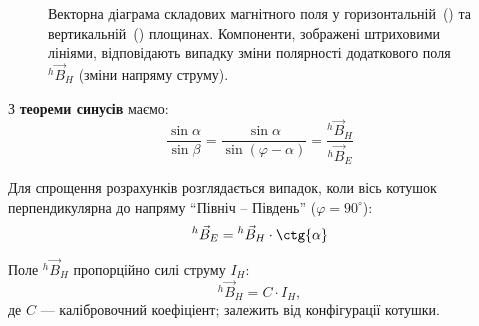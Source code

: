 \begin{figure}[ht!]
{
      }
    \caption{Векторна діаграма складових магнітного поля у   горизонтальній~() та  вертикальній~() площинах. Компоненти, зображені штриховими лініями, відповідають випадку зміни полярності додаткового поля $ {}^{h}\vec{B}_{H} $ (зміни напряму струму).}
    \label{vectordiagram}
\end{figure}

З \textbf{теореми синусів} маємо:
\begin{equation} \label{SinTheorem}
    \frac{\sin{\alpha}}{\sin{\beta}} =
    \frac{\sin{\alpha}}{\sin (\varphi - \alpha)} =
    \frac{  {}^{h}\vec{B}_{H}
           }{
           {}^{h}\vec{B}_{E}
           }
\end{equation}

Для спрощення розрахунків %
розглядається
випадок, коли вісь котушок перпендикулярна до напряму ``Північ -- Південь'' ($\varphi = 90^{\circ}$):
%
\begin{equation} \label{specialcase}
   {}^{h}\vec{B}_{E} =  {}^{h}\vec{B}_{H} \cdot \ctg{\alpha}
\end{equation}


Поле  $ {}^{h}\vec{B}_{H} $ пропорційно силі струму $I_{H}$: %
%
\begin{equation} \label{B_h}
     {}^{h}\vec{B}_{H} = C \cdot I_{H},
\end{equation}
де $C$ --- калібровочний коефіціент; залежить від конфігурації котушки.

